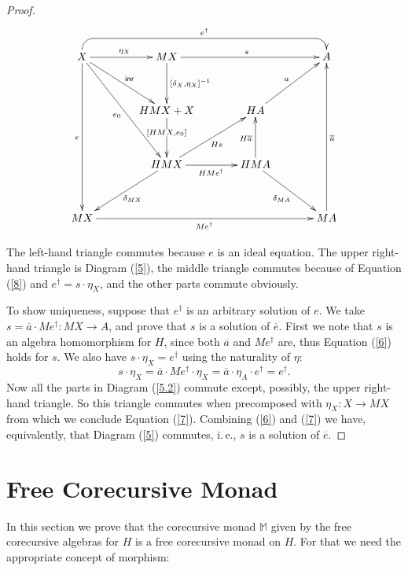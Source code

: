 \documentclass{LMCS}
\theoremstyle{plain}
\theoremstyle{definition}
\numberwithin{equation}{section}
\begin{document}
\begin{proof}
\begin{equation}\label{5.2}\vcenter{
\xymatrix@+1pc{
X\ar[r]^{\eta_X}\ar[ddd]_e\ar[rdd]_{e_0}\ar[rd]^{\mathsf{inr}}&MX\ar[d]^-{[\delta_X,\eta_X]^{-1}}\ar[rr]^s
&&A \ar@{<-} `u[l] `[lll]_{e^\dagger} [lll]\\
&HMX+X\ar[d]|(.4){[HMX,e_0]}&HA\ar[ur]^{a}\\
&HMX\ar[ld]^{\delta_{MX}}\ar[ru]_{Hs}\ar[r]_{HMe^\dagger}&HMA\ar[u]^{H\overline a}\ar[dr]_{\delta_{MA}}\\
MX\ar[rrr]_{Me^\dagger}&&&MA\ar[uuu]_{\overline a}
}}
\end{equation}

The  left-hand triangle commutes because $e$ is  an ideal equation. The  upper right-hand triangle  is Diagram (\ref{5}), the middle  triangle commutes because of Equation (\ref{8}) and $e^\dagger = s \cdot \eta_X$, and the other parts commute obviously.

To show uniqueness, suppose that $e^\dagger$ is an arbitrary solution of $e$. We take $s=\overline a\cdot Me^\dagger:MX\rightarrow A$,  and prove that $s$ is a solution of $\overline e$. First we note that $s$ is an algebra homomorphism for $H$, since both $\overline a$ and $Me^\dagger$ are, thus Equation (\ref{6}) holds for $s$. We also have $s \cdot \eta_X=e^\dagger$ using the naturality of $\eta$:
\[
s\cdot \eta_X = \overline a \cdot Me^\dagger \cdot \eta_X = \overline a \cdot \eta_A \cdot e^\dagger = e^\dagger.
\]
Now all the parts in Diagram (\ref{5.2}) commute except, possibly, the upper right-hand triangle. So this triangle commutes when precomposed with $\eta_X:X\rightarrow MX$ from which we conclude Equation (\ref{7}). Combining (\ref{6}) and (\ref{7}) we have, equivalently, that Diagram (\ref{5}) commutes, i.\,e., $s$ is a solution of $\overline e$.
\end{proof}

















\section{Free Corecursive Monad}

In this section we prove that the corecursive monad $\mathbb M$ given by the free corecursive algebras for $H$ is a free corecursive monad on $H$. For that we need the appropriate concept of morphism:
\end{document}
